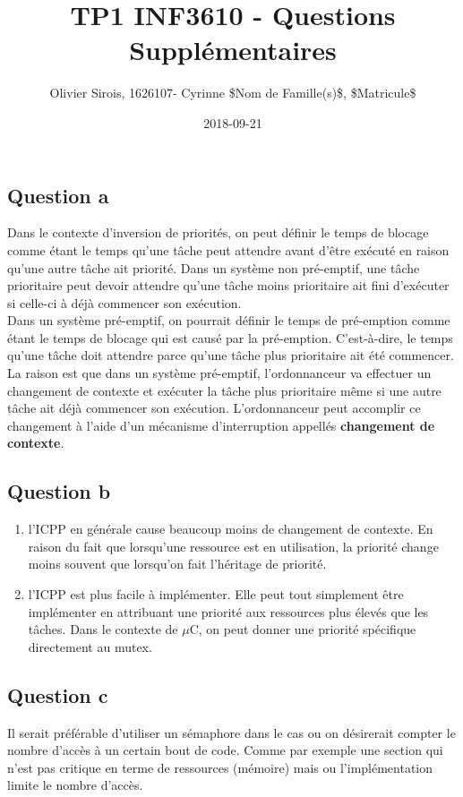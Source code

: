 \documentclass[oneside]{book}
\title{TP1 INF3610 - Questions Supplémentaires}
\date{2018-09-21}
\author{Olivier Sirois, 1626107- Cyrinne \$Nom de Famille(s)\$, \$Matricule\$}
\begin{document}
    \setcounter{page}{1}
    \maketitle
    \subsection*{Question a}
    Dans le contexte d'inversion de priorités, on peut définir le temps de blocage comme étant le temps qu'une tâche peut attendre avant d'être exécuté en raison qu'une autre tâche ait priorité. Dans un système non pré-emptif, une tâche prioritaire peut devoir attendre qu'une tâche moins prioritaire ait fini d'exécuter si celle-ci à déjà commencer son exécution.\\
    
    Dans un système pré-emptif, on pourrait définir le temps de pré-emption comme étant le temps de blocage qui est causé par la pré-emption. C'est-à-dire, le temps qu'une tâche doit attendre parce qu'une tâche plus prioritaire ait été commencer. La raison est que dans un système pré-emptif, l'ordonnanceur va effectuer un changement de contexte et exécuter la tâche plus prioritaire même si une autre tâche ait déjà commencer son exécution. L'ordonnanceur peut accomplir ce changement à l'aide d'un mécanisme d'interruption appellés \textbf{changement de contexte}.
    
    \subsection*{Question b}
    \begin{enumerate}
        \item l'ICPP en générale cause beaucoup moins de changement de contexte. En raison du fait que lorsqu'une ressource est en utilisation, la priorité change moins souvent que lorsqu'on fait l'héritage de priorité.
        \item l'ICPP est plus facile à implémenter. Elle peut tout simplement être implémenter en attribuant une priorité aux ressources plus élevés que les tâches. Dans le contexte de $\mu$C, on peut donner une priorité spécifique directement au mutex.
    \end{enumerate}

    \subsection*{Question c}
    Il serait préférable d'utiliser un sémaphore dans le cas ou on désirerait compter le nombre d'accès à un certain bout de code. Comme par exemple une section qui n'est pas critique en terme de ressources (mémoire) mais ou l'implémentation limite le nombre d'accès.
    
\end{document}
